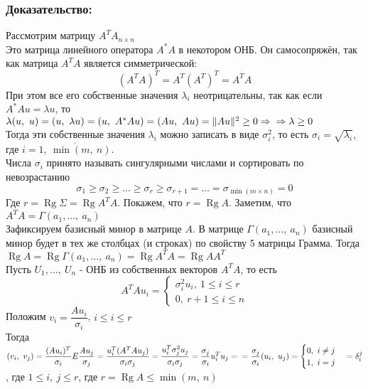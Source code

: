 \documentclass[12pt, letterpaper, twoside]{article}
\newcommand{\Rg}{\operatorname{Rg}}
\begin{document}
    \subsubsection*{Доказательство:}
    Рассмотрим матрицу $A^T A_{n\times n}$\\
    Это матрица линейного оператора $A^* A$ в некотором ОНБ. Он самосопряжён, так как матрица $A^T A$  является симметрической:
    \[(A^T A)^T = A^T(A^T)^T = A^T A\]
    При этом все его собственные значения $\lambda_i$ неотрицательны, так как если $A^* Au = \lambda u$, то $\lambda(u,\ u) = (u,\ \lambda u) = (u,\ A^* A u) = (Au,\ Au) = \Vert Au \Vert^2 \geq 0\Rightarrow\\
    \Rightarrow \lambda \geq 0$\\
    Тогда эти собственные значения $\lambda_i$ можно записать в виде $\sigma_i^2$, то есть $\sigma_i = \sqrt{\lambda_i}$, где $i = \overline{1,\ \min(m,\ n)}$.\\
    Числа $\sigma_i$ принято называть сингулярными числами и сортировать по невозрастанию
    \[\sigma_1 \geq \sigma_2 \geq \dots \geq \sigma_{r} \geq \sigma_{r + 1} = \dots = \sigma_{\min(m\times n)} = 0\]
    Где $r = \Rg \Sigma = \Rg A^T A$. Покажем, что $r = \Rg A$. Заметим, что $A^T A = \Gamma(a_1,\dots,\ a_n)$\\
    Зафиксируем базисный минор в матрице $A$. В матрице $\Gamma (a_1,\dots,\ a_n)$ базисный минор будет в тех же столбцах (и строках) по свойству 5 матрицы Грамма. Тогда $\Rg A = \Rg\Gamma(a_1,\dots,\ a_n) = \Rg A^T A = \Rg A A^T$\\
    Пусть $U_1,\dots,\ U_n$ - ОНБ из собственных векторов $A^T A$, то есть
    \[A^T A u_i = \begin{cases}
        \sigma^2_i u_i,\ 1 \leq i \leq r\\
        0,\ r + 1 \leq i \leq n
    \end{cases}\]
    Положим $v_i = \dfrac{A u_i}{\sigma_i}$, $i \leq i \leq r$\\
    Тогда $(v_i,\ v_j) = \dfrac{(Au_i)^T}{\sigma_i}E \dfrac{Au_j}{\sigma_j} = \dfrac{u_i^T(A^T A u_j)}{\sigma_i \sigma_j} = \dfrac{u_i^T \sigma_j^2 u_j}{\sigma_i \sigma_j} = \dfrac{\sigma_j}{\sigma_i}u_i^T u_j =\\
    = \dfrac{\sigma_j}{\sigma_i} (u_i,\ u_j) = \begin{cases}
        0,\ i\neq j\\
        1,\ i = j
    \end{cases} = \delta_i^j$, где $1 \leq i,\ j \leq r$, где $r = \Rg A\leq \min (m,\ n)$\\
\end{document}
